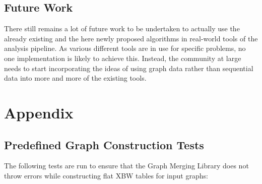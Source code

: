 \documentclass[a4paper,12pt,twoside,BCOR=10mm]{scrbook}
\begin{document}
\section{Future Work}

There still remains a lot of future work to be undertaken to actually use 
the already existing and the here newly proposed algorithms in real-world 
tools of the analysis pipeline. 
As various different tools are in use for specific problems, no one implementation 
is likely to achieve this. Instead, the community at large needs to start 
incorporating the ideas of using graph data rather than sequential data into 
more and more of the existing tools.



\appendix
\renewcommand{\chaptername}{Appendix}
\chapter{Appendix}
%

\section{Predefined Graph Construction Tests}
\label{sec:appendix_graph_const_tests}
%


The following tests are run to ensure that the Graph Merging Library does not throw errors 
while constructing flat XBW tables for input graphs:
\end{document}
